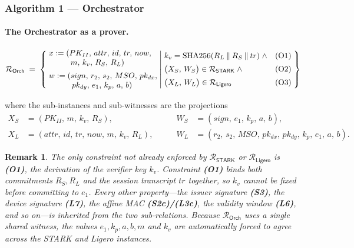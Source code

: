 \documentclass{article}
\newcommand{\concat}{\mathbin{\|}}
\newcommand{\SHA}{\mathrm{SHA256}}
\newcommand{\Rel}[1]{\mathcal{R}_{#1}}
\newcommand{\RelSTARK}{\Rel{\mathsf{STARK}}}
\newcommand{\RelLigero}{\Rel{\mathsf{Ligero}}}
\newcommand{\RelOrch}{\Rel{\mathsf{Orch}}}
\newtheorem{remark}{Remark}
\begin{document}
\subsubsection{Algorithm 1 --- Orchestrator}
\label{sec:orchestrator}

\paragraph{The Orchestrator as a prover.} 

\begin{mdframed}[style=relationbox]
{\small
\[
\RelOrch \;=\; \left\{\;
\begin{array}{@{}l@{}}
x := (PK_{II},\, attr,\, id,\, tr,\, now, \\
\phantom{x := (}\, m,\, k_v,\, R_S,\, R_L) \\[5pt]
w := (sign,\, r_2,\, s_2,\, MSO,\, pk_{dx}, \\
\phantom{w := (}\, pk_{dy},\, e_1,\, k_p,\, a,\, b)
\end{array}
\;\middle|\;
\begin{array}{@{}l@{\quad}r@{}}
k_v = \SHA(R_L \concat R_S \concat tr) \;\wedge & \text{(O1)} \\[5pt]
\bigl(X_S,\, W_S\bigr) \in \RelSTARK \;\wedge & \text{(O2)} \\[5pt]
\bigl(X_L,\, W_L\bigr) \in \RelLigero & \text{(O3)}
\end{array}
\;\right\}
\]
}
\end{mdframed}

\noindent where the sub-instances and sub-witnesses are the projections
\[
\begin{aligned}
X_S &= (PK_{II},\, m,\, k_v,\, R_S), &\qquad
W_S &= (sign,\, e_1,\, k_p,\, a,\, b), \\
X_L &= (attr,\, id,\, tr,\, now,\, m,\, k_v,\, R_L), &\qquad
W_L &= (r_2,\, s_2,\, MSO,\, pk_{dx},\, pk_{dy},\, k_p,\, e_1,\, a,\, b).
\end{aligned}
\]

\begin{remark}
The only constraint not already enforced by $\RelSTARK$ or $\RelLigero$ is
\textbf{(O1)}, the derivation of the verifier key $k_v$. Constraint
\textbf{(O1)} binds \emph{both} commitments $R_S, R_L$ and the session
transcript $tr$ together, so $k_v$ cannot be fixed before committing to $e_1$.
Every other property---the issuer signature \textbf{(S3)}, the device
signature \textbf{(L7)}, the affine MAC \textbf{(S2c)/(L3c)}, the validity
window \textbf{(L6)}, and so on---is inherited from the two sub-relations.
Because $\RelOrch$ uses a single shared witness, the values $e_1, k_p, a, b, m$
and $k_v$ are automatically forced to agree across the STARK and Ligero
instances.
\end{remark}
\end{document}

